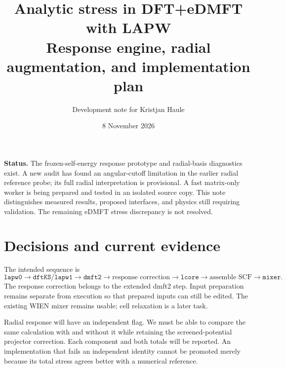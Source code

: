 \documentclass[11pt]{article}
\title{Analytic stress in DFT+eDMFT with LAPW\\\large Response engine, radial augmentation, and implementation plan}
\author{Development note for Kristjan Haule}
\date{8 November 2026}
\begin{document}
\maketitle
\noindent\textbf{Status.} The frozen-self-energy response prototype and radial-basis diagnostics exist. A new audit has found an angular-cutoff limitation in the earlier radial reference probe; its full radial interpretation is provisional. A fast matrix-only worker is being prepared and tested in an isolated source copy. This note distinguishes measured results, proposed interfaces, and physics still requiring validation. The remaining eDMFT stress discrepancy is not resolved.

\section{Decisions and current evidence}
The intended sequence is
\[
\texttt{lapw0}\to\texttt{dftKS/lapw1}\to\texttt{dmft2}\to
\boxed{\text{response correction}}\to\texttt{lcore}\to
\text{assemble SCF}\to\texttt{mixer}.
\]
The response correction belongs to the extended dmft2 step. Input preparation remains separate from execution so that prepared inputs can still be edited. The existing WIEN mixer remains usable; cell relaxation is a later task.

Radial response will have an independent flag. We must be able to compare the same calculation with and without it while retaining the screened-potential projector correction. Each component and both totals will be reported. An implementation that fails an independent identity cannot be promoted merely because its total stress agrees better with a numerical reference.
\end{document}
